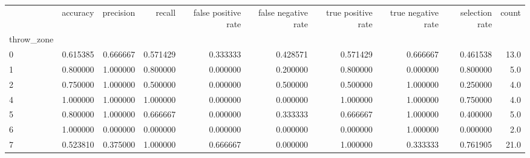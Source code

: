 \begin{tabular}{lrrrrrrrrr}
\toprule
{} &  accuracy &  precision &    recall &  false positive rate &  false negative rate &  true positive rate &  true negative rate &  selection rate &  count \\
throw\_zone &           &            &           &                      &                      &                     &                     &                 &        \\
\midrule
0          &  0.615385 &   0.666667 &  0.571429 &             0.333333 &             0.428571 &            0.571429 &            0.666667 &        0.461538 &   13.0 \\
1          &  0.800000 &   1.000000 &  0.800000 &             0.000000 &             0.200000 &            0.800000 &            0.000000 &        0.800000 &    5.0 \\
2          &  0.750000 &   1.000000 &  0.500000 &             0.000000 &             0.500000 &            0.500000 &            1.000000 &        0.250000 &    4.0 \\
4          &  1.000000 &   1.000000 &  1.000000 &             0.000000 &             0.000000 &            1.000000 &            1.000000 &        0.750000 &    4.0 \\
5          &  0.800000 &   1.000000 &  0.666667 &             0.000000 &             0.333333 &            0.666667 &            1.000000 &        0.400000 &    5.0 \\
6          &  1.000000 &   0.000000 &  0.000000 &             0.000000 &             0.000000 &            0.000000 &            1.000000 &        0.000000 &    2.0 \\
7          &  0.523810 &   0.375000 &  1.000000 &             0.666667 &             0.000000 &            1.000000 &            0.333333 &        0.761905 &   21.0 \\
\bottomrule
\end{tabular}
